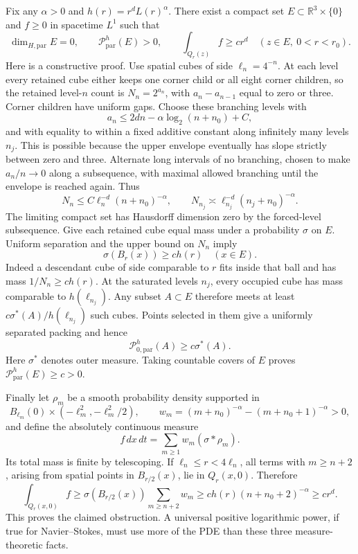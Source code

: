 \documentclass[11pt]{article}
\begin{document}
Fix any $\alpha>0$ and $h(r)=r^dL(r)^\alpha$. There exist a compact set $E\subset\mathbb R^3\times\{0\}$ and $f\ge0$ in spacetime $L^1$ such that
$$
\dim_{H,\mathrm{par}}E=0,\qquad
\mathcal P^{h}_{\mathrm{par}}(E)>0,\qquad
\int_{Q_r(z)}f\ge c r^d
\quad(z\in E,\ 0<r<r_0).
$$
Here is a constructive proof. Use spatial cubes of side $\ell_n=4^{-n}$. At each level every retained cube either keeps one corner child or all eight corner children, so the retained level-$n$ count is $N_n=2^{a_n}$, with $a_n-a_{n-1}$ equal to zero or three. Corner children have uniform gaps. Choose these branching levels with
$$
a_n\le 2dn-\alpha\log_2(n+n_0)+C,
$$
and with equality to within a fixed additive constant along infinitely many levels $n_j$. This is possible because the upper envelope eventually has slope strictly between zero and three. Alternate long intervals of no branching, chosen to make $a_n/n\to0$ along a subsequence, with maximal allowed branching until the envelope is reached again. Thus
$$
N_n\le C\ell_n^{-d}(n+n_0)^{-\alpha},
\qquad
N_{n_j}\asymp\ell_{n_j}^{-d}(n_j+n_0)^{-\alpha}.
$$
The limiting compact set has Hausdorff dimension zero by the forced-level subsequence. Give each retained cube equal mass under a probability $\sigma$ on $E$. Uniform separation and the upper bound on $N_n$ imply
$$
\sigma(B_r(x))\ge c h(r)\quad(x\in E).
$$
Indeed a descendant cube of side comparable to $r$ fits inside that ball and has mass $1/N_n\ge c h(r)$. At the saturated levels $n_j$, every occupied cube has mass comparable to $h(\ell_{n_j})$. Any subset $A\subset E$ therefore meets at least $c\sigma^*(A)/h(\ell_{n_j})$ such cubes. Points selected in them give a uniformly separated packing and hence
$$
\mathcal P^h_{0,\mathrm{par}}(A)\ge c\sigma^*(A).
$$
Here $\sigma^*$ denotes outer measure. Taking countable covers of $E$ proves $\mathcal P^h_{\mathrm{par}}(E)\ge c>0$.

Finally let $\rho_m$ be a smooth probability density supported in
$$
B_{\ell_m}(0)\times(-\ell_m^2,-\ell_m^2/2),
\qquad
w_m=(m+n_0)^{-\alpha}-(m+n_0+1)^{-\alpha}>0,
$$
and define the absolutely continuous measure
$$
f\,dx\,dt=\sum_{m\ge1}w_m(\sigma*\rho_m).
$$
Its total mass is finite by telescoping. If $\ell_n\le r<4\ell_n$, all terms with $m\ge n+2$, arising from spatial points in $B_{r/2}(x)$, lie in $Q_r(x,0)$. Therefore
$$
\int_{Q_r(x,0)}f
\ge\sigma(B_{r/2}(x))\sum_{m\ge n+2}w_m
\ge c h(r)(n+n_0+2)^{-\alpha}
\ge c r^d.
$$
This proves the claimed obstruction. A universal positive logarithmic power, if true for Navier--Stokes, must use more of the PDE than these three measure-theoretic facts.
\end{document}
